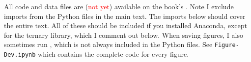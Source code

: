 \lstlistoflistings
\bigskip

\noindent All code and data files are (\textcolor{red}{not yet}) available on the book's . Note I exclude imports from the Python files in the main text. The imports below should cover the entire text. All of these should be included if you installed Anaconda, except for the ternary library, which I comment out below. When saving figures, I also sometimes run , which is not always included in the Python files. See \texttt{Figure-Dev.ipynb} which contains the complete code for every figure.


